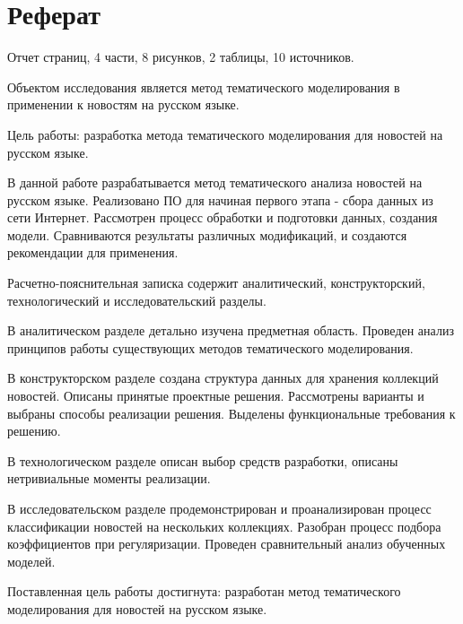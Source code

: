 \chapter*{Реферат}

Отчет страниц, 4 части, 8 рисунков, 2 таблицы, 10 источников.

Объектом исследования является метод тематического моделирования в применении к новостям на русском языке.

Цель работы: разработка метода тематического моделирования для новостей на русском языке.

В данной работе разрабатывается метод тематического анализа новостей на русском языке. Реализовано ПО для  начиная первого этапа - сбора данных из сети Интернет. Рассмотрен процесс обработки и подготовки данных, создания модели. Сравниваются результаты различных модификаций, и создаются рекомендации для применения.


Расчетно-пояснительная записка содержит аналитический, конструкторский, технологический и исследовательский разделы.

В аналитическом разделе детально изучена предметная область. Проведен анализ принципов работы существующих методов тематического моделирования.

В конструкторском разделе создана структура данных для хранения коллекций новостей. Описаны принятые проектные решения. Рассмотрены варианты и выбраны способы реализации решения. Выделены функциональные требования к решению.

В технологическом разделе описан выбор средств разработки, описаны нетривиальные моменты реализации. 

В исследовательском разделе продемонстрирован и проанализирован процесс классификации новостей на нескольких коллекциях. Разобран процесс подбора коэффициентов при регуляризации. Проведен сравнительный анализ обученных моделей.

Поставленная цель работы достигнута: разработан метод тематического моделирования для новостей на русском языке.